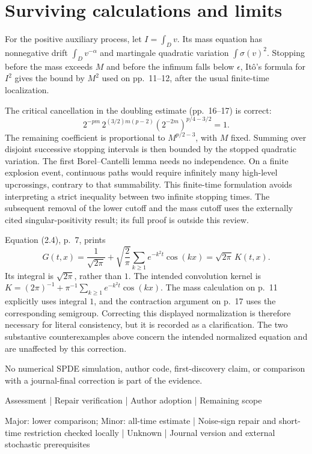 \documentclass[10pt]{article}
\begin{document}
\section*{Surviving calculations and limits}
For the positive auxiliary process, let \(I=\int_Dv\). Its mass equation has nonnegative drift \(\int_Dv^{-\alpha}\) and martingale quadratic variation \(\int\sigma(v)^2\). Stopping before the mass exceeds \(M\) and before the infimum falls below \(\epsilon\), Itô’s formula for \(I^2\) gives the bound by \(M^2\) used on pp. 11–12, after the usual finite-time localization.\par
The critical cancellation in the doubling estimate (pp. 16–17) is correct: \[2^{-pm}\,2^{(3/2)m(p-2)}
                (2^{-2m})^{p/4-3/2}=1.\] The remaining coefficient is proportional to \(M^{p/2-3}\), with \(M\) fixed. Summing over disjoint successive stopping intervals is then bounded by the stopped quadratic variation. The first Borel–Cantelli lemma needs no independence. On a finite explosion event, continuous paths would require infinitely many high-level upcrossings, contrary to that summability. This finite-time formulation avoids interpreting a strict inequality between two infinite stopping times. The subsequent removal of the lower cutoff and the mass cutoff uses the externally cited singular-positivity result; its full proof is outside this review.\par
Equation (2.4), p. 7, prints \[G(t,x)=\frac1{\sqrt{2\pi}}
       +\sqrt{\frac2\pi}\sum_{k\ge1}e^{-k^2t}\cos(kx)
       =\sqrt{2\pi}\,K(t,x).\] Its integral is \(\sqrt{2\pi}\), rather than \(1\). The intended convolution kernel is \(K=(2\pi)^{-1}+\pi^{-1}\sum_{k\ge1}e^{-k^2t}\cos(kx)\). The mass calculation on p. 11 explicitly uses integral \(1\), and the contraction argument on p. 17 uses the corresponding semigroup. Correcting this displayed normalization is therefore necessary for literal consistency, but it is recorded as a clarification. The two substantive counterexamples above concern the intended normalized equation and are unaffected by this correction.\par
No numerical SPDE simulation, author code, first-discovery claim, or comparison with a journal-final correction is part of the evidence.\par
Assessment | Repair verification | Author adoption | Remaining scope\par
Major: lower comparison; Minor: all-time estimate | Noise-sign repair and short-time restriction checked locally | Unknown | Journal version and external stochastic prerequisites\par
\end{document}
